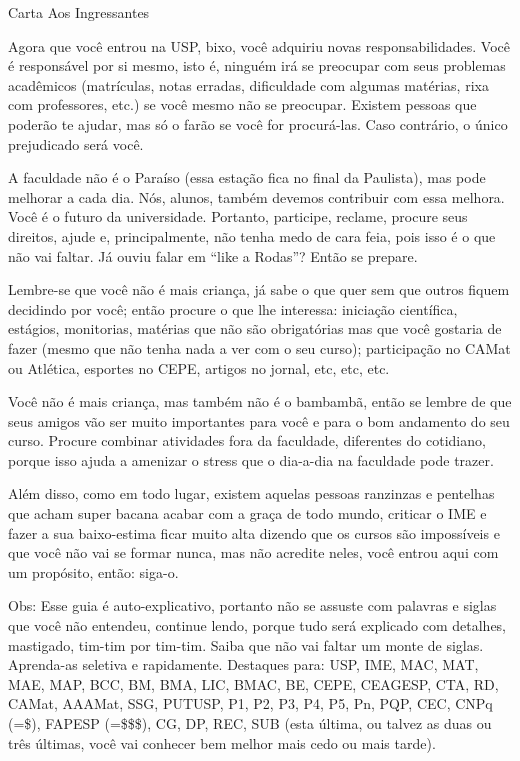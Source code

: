 \begin{secao}{Carta Aos Ingressantes}

Agora que você entrou na USP, bixo, você adquiriu novas responsabilidades.
Você é responsável por si mesmo, isto é, ninguém irá se preocupar com seus
problemas acadêmicos (matrículas, notas erradas, dificuldade com algumas
matérias, rixa com professores, etc.) se você mesmo não se preocupar. Existem
pessoas que poderão te ajudar, mas só o farão se você for procurá-las. Caso
contrário, o único prejudicado será você.

A faculdade não é o Paraíso (essa estação fica no final da Paulista), mas pode
melhorar a cada dia. Nós, alunos, também devemos contribuir com essa melhora.
Você é o futuro da universidade. Portanto, participe, reclame, procure seus
direitos, ajude e, principalmente, não tenha medo de cara feia, pois isso é o
que não vai faltar. Já ouviu falar em “like a Rodas”? Então se prepare.

Lembre-se que você não é mais criança, já sabe o que quer sem que outros fiquem
decidindo por você; então procure o que lhe interessa: iniciação científica,
estágios, monitorias, matérias que não são obrigatórias mas que você gostaria
de fazer (mesmo que não tenha nada a ver com o seu curso); participação no
CAMat ou Atlética, esportes no CEPE, artigos no jornal, etc, etc, etc.

Você não é mais criança, mas também não é o bambambã, então se lembre de que
seus amigos vão ser muito importantes para você e para o bom andamento do seu
curso. Procure combinar atividades fora da faculdade, diferentes do cotidiano,
porque isso ajuda a amenizar o stress que o dia-a-dia na faculdade pode trazer.

Além disso, como em todo lugar, existem aquelas pessoas ranzinzas e pentelhas
que acham super bacana acabar com a graça de todo mundo, criticar o IME e fazer
a sua baixo-estima ficar muito alta dizendo que os cursos são impossíveis e que
você não vai se formar nunca, mas não acredite neles, você entrou aqui com um
propósito, então: siga-o.

Obs: Esse guia é auto-explicativo, portanto não se assuste com palavras e siglas
que você não entendeu, continue lendo, porque tudo será explicado com detalhes,
mastigado, tim-tim por tim-tim. Saiba que não vai faltar um monte de siglas.
Aprenda-as seletiva e rapidamente. Destaques para: USP, IME, MAC, MAT, MAE, MAP,
BCC, BM, BMA, LIC, BMAC, BE, CEPE, CEAGESP, CTA, RD, CAMat, AAAMat, SSG, PUTUSP,
P1, P2, P3, P4, P5, Pn, PQP, CEC, CNPq (=\$), FAPESP (=\$\$\$), CG, DP, REC, SUB
(esta última, ou talvez as duas ou três últimas, você vai conhecer bem melhor
mais cedo ou mais tarde).

\end{secao}
